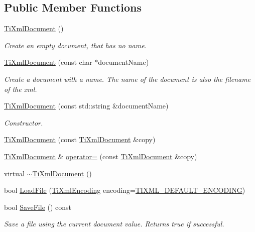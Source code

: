 \subsection*{Public Member Functions}
\begin{DoxyCompactItemize}
\item 
\hyperlink{class_ti_xml_document_a9f5e84335708fde98400230f9f12659c}{Ti\-Xml\-Document} ()
\begin{DoxyCompactList}\small\item\em Create an empty document, that has no name. \end{DoxyCompactList}\item 
\hyperlink{class_ti_xml_document_ae4508b452d0c3061db085f3db27b8396}{Ti\-Xml\-Document} (const char $\ast$document\-Name)
\begin{DoxyCompactList}\small\item\em Create a document with a name. The name of the document is also the filename of the xml. \end{DoxyCompactList}\item 
\hyperlink{class_ti_xml_document_a2c6e58fb99bfa76cc613f16840022225}{Ti\-Xml\-Document} (const std\-::string \&document\-Name)
\begin{DoxyCompactList}\small\item\em Constructor. \end{DoxyCompactList}\item 
\hyperlink{class_ti_xml_document_a323a7486e7da6099cdc19a5ff7e74b07}{Ti\-Xml\-Document} (const \hyperlink{class_ti_xml_document}{Ti\-Xml\-Document} \&copy)
\item 
\hyperlink{class_ti_xml_document}{Ti\-Xml\-Document} \& \hyperlink{class_ti_xml_document_aa56fd4dbe8917d2033d865909e2d737e}{operator=} (const \hyperlink{class_ti_xml_document}{Ti\-Xml\-Document} \&copy)
\item 
virtual \hyperlink{class_ti_xml_document_a1b8a035c2c2aab38e4387246a0b712c5}{$\sim$\-Ti\-Xml\-Document} ()
\item 
bool \hyperlink{class_ti_xml_document_a4c852a889c02cf251117fd1d9fe1845f}{Load\-File} (\hyperlink{tinyxml_8h_a88d51847a13ee0f4b4d320d03d2c4d96}{Ti\-Xml\-Encoding} encoding=\hyperlink{tinyxml_8h_ad5b8b092878e9010d6400cb6c13d4879}{T\-I\-X\-M\-L\-\_\-\-D\-E\-F\-A\-U\-L\-T\-\_\-\-E\-N\-C\-O\-D\-I\-N\-G})
\item 
bool \hyperlink{class_ti_xml_document_a21c0aeb0d0a720169ad4ac89523ebe93}{Save\-File} () const 
\begin{DoxyCompactList}\small\item\em Save a file using the current document value. Returns true if successful. \end{DoxyCompactList}\item 

\end{DoxyCompactItemize}
